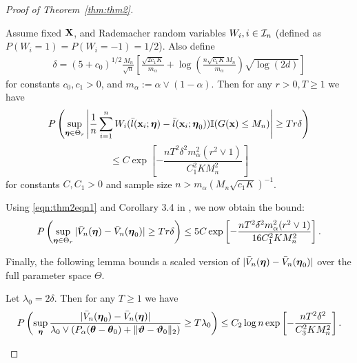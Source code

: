 \documentclass[11pt,letterpaper]{article}
\numberwithin{equation}{section}
\begin{document}
\begin{proof}[Proof of Theorem~\ref{thm:thm2}]
\begin{Lemma}\label{lemma:thm2lemma2}
Assume fixed ${\mathbf{X}}$, and Rademacher random variables $W_i, i \in {\cal{I}}_n$ (defined as $P(W_i = 1) = P(W_i = -1) = 1/2$). Also define
%
\begin{align}\label{eqn:defineDelta}
\delta = ( 5 + c_0 )^{1/2} \frac{M_n}{\sqrt n} \left[ \frac{ \sqrt{2 c_1 K}}{m_\alpha} + 
\log \left( \frac{n \sqrt{c_1 K} M_n}{m_\alpha} \right) \sqrt{ \log (2d)} \right]
\end{align}
%
for constants $c_0, c_1 > 0$, and $m_\alpha := \alpha \vee (1-\alpha)$. Then for any $r>0, T \geq 1$ we have
%
$$
P \left( \sup_{{\boldsymbol{\eta}} \in \Theta_r} \left| \frac{1}{n} \sum_{i=1}^n W_i (\bar l({\bf{x}}_i; {\boldsymbol{\eta}}) -  \bar l( {\bf{x}}_i; {\boldsymbol{\eta}}_0)) {\mathbb{I}}(G({\bf{x}}) \leq M_n ) \right| \geq T r \delta \right) $$
$$ \leq C \exp \left[ - \frac{n T^2 \delta^2 m_\alpha^2 ( r^2 \vee 1)}{ C_1^2 K M_n^2} \right]
$$
%
for constants $C, C_1 > 0$ and sample size $n > m_\alpha (M_n \sqrt{c_1 K})^{-1}$.
\end{Lemma}

Using \eqref{eqn:thm2eqn1} and Corollary 3.4 in \cite{vandeGeerBook00}, we now obtain the bound:
%
\begin{align}\label{eqn:thm2eqn3}
P \left( \sup_{{\boldsymbol{\eta}} \in \Theta_r} | \bar V_n({\boldsymbol{\eta}}) - \bar V_n({\boldsymbol{\eta}}_0) |
\geq T r \delta \right) \leq
5 C \exp \left[ - \frac{n T^2 \delta^2 m_\alpha^2 ( r^2 \vee 1)}{ 16 C_1^2 K M_n^2} \right].
\end{align}

Finally, the following lemma bounds a scaled version of $| \bar V_n({\boldsymbol{\eta}}) - \bar V_n({\boldsymbol{\eta}}_0) |$ over the full parameter space $\Theta$.

\begin{Lemma}\label{lemma:thm2lemma3}
Let $\lambda_0 = 2 \delta$. Then for any $T \geq 1$ we have
%
$$
P \left( \sup_{\boldsymbol{\eta}} \frac{ |\bar V_n({\boldsymbol{\eta}}_0) - \bar V_n({\boldsymbol{\eta}})| }{\lambda_0 \vee
(P_\alpha({\boldsymbol{\theta}} - {\boldsymbol{\theta}}_0) + \| {\boldsymbol{\vartheta}} - {\boldsymbol{\vartheta}}_0 \|_2) } \geq T \lambda_0 \right) \leq
C_2 \log n \exp \left[ - \frac{n T^2 \delta^2 }{ C_3^2 K M_n^2} \right].
$$
\end{Lemma}


\end{proof}
\end{document}
